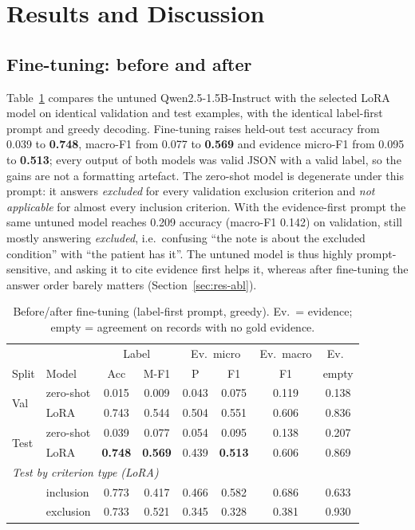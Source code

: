 \section{Results and Discussion}
\label{sec:results}

\subsection{Fine-tuning: before and after}
\label{sec:res-ft}

Table~\ref{tab:main} compares the untuned Qwen2.5-1.5B-Instruct with the selected LoRA model on
identical validation and test examples, with the identical label-first prompt and greedy decoding.
Fine-tuning raises held-out test accuracy from 0.039 to \textbf{0.748}, macro-F1 from 0.077 to
\textbf{0.569} and evidence micro-F1 from 0.095 to \textbf{0.513}; every output of both models
was valid JSON with a valid label, so the gains are not a formatting artefact. The zero-shot model
is degenerate under this prompt: it answers \emph{excluded} for every validation exclusion criterion
and \emph{not applicable} for almost every inclusion criterion. With the evidence-first prompt the
same untuned model reaches 0.209 accuracy (macro-F1 0.142) on validation, still mostly answering
\emph{excluded}, i.e.\ confusing ``the note is about the excluded condition'' with ``the patient has
it''. The untuned model is thus highly prompt-sensitive, and asking it to cite evidence first helps
it, whereas after fine-tuning the answer order barely matters (Section~\ref{sec:res-abl}).

\begin{table}[t]
\centering
\caption{Before/after fine-tuning (label-first prompt, greedy). Ev.\ = evidence;
empty = agreement on records with no gold evidence.}
\label{tab:main}
\setlength{\tabcolsep}{3pt}
\begin{tabular}{llcccccc}
\toprule
 & & \multicolumn{2}{c}{Label} & \multicolumn{2}{c}{Ev.\ micro} & Ev.\ macro & Ev.\ \\
Split & Model & Acc & M-F1 & P & F1 & F1 & empty \\
\midrule
\multirow{2}{*}{Val} & zero-shot & 0.015 & 0.009 & 0.043 & 0.075 & 0.119 & 0.138 \\
 & LoRA & 0.743 & 0.544 & 0.504 & 0.551 & 0.606 & 0.836 \\
\midrule
\multirow{2}{*}{Test} & zero-shot & 0.039 & 0.077 & 0.054 & 0.095 & 0.138 & 0.207 \\
 & LoRA & \textbf{0.748} & \textbf{0.569} & 0.439 & \textbf{0.513} & 0.606 & 0.869 \\
\midrule
\multicolumn{8}{l}{\emph{Test by criterion type (LoRA)}} \\
 & inclusion & 0.773 & 0.417 & 0.466 & 0.582 & 0.686 & 0.633 \\
 & exclusion & 0.733 & 0.521 & 0.345 & 0.328 & 0.381 & 0.930 \\
\bottomrule
\end{tabular}
\end{table}

